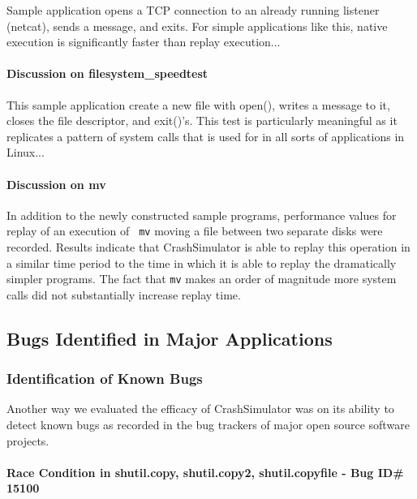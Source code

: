         Sample application opens a TCP connection to an already running listener (netcat), sends a message, and
        exits. For simple applications like this, native execution is significantly faster than replay execution...

        \paragraph{Discussion on filesystem\_speedtest}

        This sample application create a new file with open(), writes a message to it, closes the file descriptor, and
        exit()'s. This test is particularly meaningful as it replicates a pattern of system calls that is used for in
        all sorts of applications in Linux...

        \paragraph{Discussion on mv}

        In addition to the newly constructed sample programs, performance values for replay of an execution of {\tt
          mv} moving a file between two separate disks were recorded.  Results indicate that CrashSimulator is able to
        replay this operation in a similar time period to the time in which it is able to replay the dramatically
        simpler programs.  The fact that {\tt mv} makes an order of magnitude more system calls did not substantially
        increase replay time.

            
    \subsection{Bugs Identified in Major Applications}

        \subsubsection{Identification of Known Bugs}

        Another way we evaluated the efficacy of CrashSimulator was on its ability to detect known bugs as recorded in
        the bug trackers of major open source software projects.

            \paragraph{Race Condition in shutil.copy, shutil.copy2, shutil.copyfile - Bug ID\# 15100}
              
